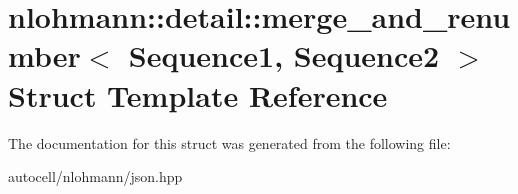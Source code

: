 \hypertarget{structnlohmann_1_1detail_1_1merge__and__renumber}{}\section{nlohmann\+:\+:detail\+:\+:merge\+\_\+and\+\_\+renumber$<$ Sequence1, Sequence2 $>$ Struct Template Reference}
\label{structnlohmann_1_1detail_1_1merge__and__renumber}


The documentation for this struct was generated from the following file\+:\begin{DoxyCompactItemize}
\item 
autocell/nlohmann/json.\+hpp\end{DoxyCompactItemize}
